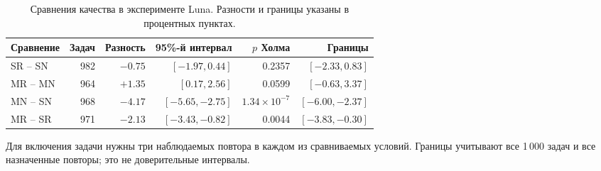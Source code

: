 \begin{table}[htbp]\centering\small
\caption{Сравнения качества в эксперименте Luna. Разности и границы указаны в процентных пунктах.}
\label{tab:scale-contrasts}
\begin{tabular}{lrrrrr}\toprule
Сравнение & Задач & Разность & 95\%-й интервал & $p$ Холма & Границы\\\midrule
SR -- SN & 982 & $-0.75$ & $[-1.97, 0.44]$ & 0.2357 & $[-2.33, 0.83]$\\
MR -- MN & 964 & $+1.35$ & $[0.17, 2.56]$ & 0.0599 & $[-0.63, 3.37]$\\
MN -- SN & 968 & $-4.17$ & $[-5.65, -2.75]$ & $1.34\times10^{-7}$ & $[-6.00, -2.37]$\\
MR -- SR & 971 & $-2.13$ & $[-3.43, -0.82]$ & 0.0044 & $[-3.83, -0.30]$\\
\bottomrule\end{tabular}
\par\smallskip\noindent Для включения задачи нужны три наблюдаемых повтора в каждом из сравниваемых условий. Границы учитывают все 1\,000 задач и все назначенные повторы; это не доверительные интервалы.
\end{table}
